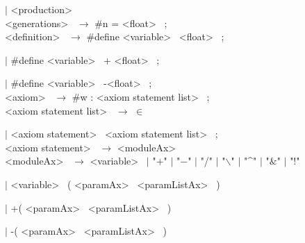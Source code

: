 \hspace{2cm} $|$ \textless production\textgreater~\\



\noindent
\textless generations\textgreater~ $\rightarrow$ \#n = \textless float\textgreater~ ; \\



\noindent
\textless definition\textgreater~ $\rightarrow$  \#define \textless variable\textgreater~ \textless float\textgreater~ ;

\hspace{2cm} $|$ \#define \textless variable\textgreater~ + \textless float\textgreater~ ;

\hspace{2cm} $|$ \#define \textless variable\textgreater~ -\textless float\textgreater~ ; \\



\noindent
\textless axiom\textgreater~ $\rightarrow$  \#w : \textless axiom statement list\textgreater~ ; \\



\noindent
\textless axiom statement list\textgreater~ $\rightarrow$ $\in$ 

\hspace{2cm} $|$ \textless axiom statement\textgreater~ \textless axiom statement list\textgreater~ ; \\



\noindent
\textless axiom statement\textgreater~ $\rightarrow$ \textless moduleAx\textgreater~ \\



\noindent
\textless moduleAx\textgreater~  $\rightarrow$ \textless variable\textgreater~ $|$ "$+$" $|$ "$-$" $|$ "/" $|$ "$\backslash$" $|$ "\textasciicircum" $|$ "$\&$" $|$ "!" 

\hspace{2cm} $|$ \textless variable\textgreater~ (  \textless paramAx\textgreater~ \textless paramListAx\textgreater~ )

\hspace{2cm} $|$ +(  \textless paramAx\textgreater~ \textless paramListAx\textgreater~ ) 

\hspace{2cm} $|$ -(  \textless paramAx\textgreater~ \textless paramListAx\textgreater~ ) 


